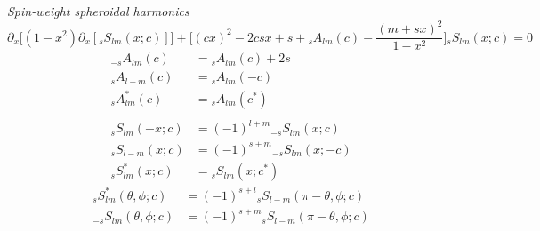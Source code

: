 \documentclass[11pt]{article}
\begin{document}
\noindent
{\it Spin-weight spheroidal harmonics} \\
\begin{equation}
\partial_x \Big[ (1-x^2)\partial_x [{}_sS_{lm}(x;c)]\Big] + \bigg[(cx)^2 - 2 csx + s + {}_sA_{lm}(c) - \frac{(m+sx)^2}{1-x^2}\bigg]{}_sS_{lm}(x;c) = 0
\end{equation}
\begin{align}
{}_{-s}A_{lm}(c) &= {}_sA_{lm}(c)+2s \\
{}_sA_{l-m}(c) &= {}_sA_{lm}(-c) \\
{}_sA^*_{lm}(c) &= {}_sA_{lm}(c^*) \\\nonumber\\
{}_sS_{lm}(-x;c) &= (-1)^{l+m} {}_{-s}S_{lm}(x;c) \\
{}_sS_{l-m}(x;c) &= (-1)^{s+m} {}_{-s}S_{lm}(x;-c) \\
{}_sS^*_{lm}(x;c) &= {}_sS_{lm}(x;c^*)
\end{align}
\begin{align}
{}_sS^*_{lm}(\theta, \phi ; c) &= (-1)^{s+l} {}_{s}S_{l-m}(\pi-\theta, \phi ; c) \label{sSlm:eq1} \\
{}_{-s}S_{lm}(\theta, \phi ; c) &= (-1)^{s+m} {}_{s}S_{l-m}(\pi-\theta, \phi ; c)
\end{align}
\end{document}
